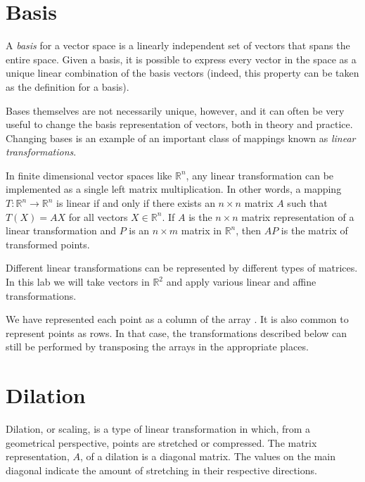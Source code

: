 \label{lab:ChangeBasis}


\section*{Basis}
A \emph{basis} for a vector space is a linearly independent set of vectors that spans the entire space. Given a basis, it is possible to express every vector in the space as a unique linear combination of the basis vectors (indeed, this property can be taken as the definition for a basis).

Bases themselves are not necessarily unique, however, and it can often be very useful to change the basis representation of vectors, both in theory and practice. Changing bases is an example of an important class of mappings known as \emph{linear transformations}.

In finite dimensional vector spaces like $\mathbb{R}^n$, any linear
transformation can be implemented as a single left matrix multiplication.
In other words, a mapping $T : \mathbb{R}^n \to \mathbb{R}^n$ is linear if and only if there exists an $n \times n$ matrix $A$ such that $T\left(X\right) = AX$ for all vectors $X \in \mathbb{R}^n$. If $A$ is the $n \times n$ matrix representation of a linear transformation and $P$ is an $n \times m$ matrix in $\mathbb{R}^n$, then $AP$ is the matrix of transformed points.

Different linear transformations can be represented by different types of matrices. In this lab we will take vectors in $\mathbb{R}^2$ and apply various linear and affine transformations.

We have represented each point as a column of the array .
It is also common to represent points as rows. In that case, the transformations described below can still be performed by transposing the arrays in the appropriate places.

\section*{Dilation}
Dilation, or scaling, is a type of linear transformation in which, from a geometrical perspective, points are stretched or compressed.
The matrix representation, $A$, of a dilation is a diagonal matrix. The values on the main diagonal indicate the amount of stretching in their respective directions.

